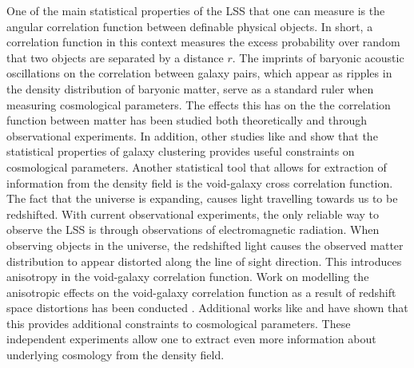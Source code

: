 One of the main statistical properties of the LSS that one can measure is the angular correlation function between definable physical objects. In short, a correlation function in this context measures the excess probability over random that two objects are separated by a distance $r$. The imprints of baryonic acoustic oscillations on the correlation between galaxy pairs\cite{pe00300h}, which appear as ripples in the density distribution of baryonic matter, serve as a standard ruler when measuring cosmological parameters. The effects this has on the the correlation function between matter has been studied both theoretically\cite{peebles1980} and through observational experiments\cite{Eisenstein_2005}. In addition, other studies like \cite{refId0} and \cite{Bautista_2020} show that the statistical properties of galaxy clustering provides useful constraints on cosmological parameters. Another statistical tool that allows for extraction of information from the density field is the void-galaxy cross correlation function. The fact that the universe is expanding\cite{Hubble168}, causes light travelling towards us to be redshifted. With current observational experiments, the only reliable way to observe the LSS is through observations of electromagnetic radiation. When observing objects in the universe, the redshifted light causes the observed matter distribution to appear distorted along the line of sight direction. This introduces anisotropy in the void-galaxy correlation function. Work on modelling the anisotropic effects on the void-galaxy correlation function as a result of redshift space distortions has been conducted \cite{Nadathur_corr}. Additional works like \cite{BeyondBAO} and \cite{Nadathur_2020} have shown that this provides additional constraints to cosmological parameters. These independent experiments allow one to extract even more information about underlying cosmology from the density field.\\\indent

